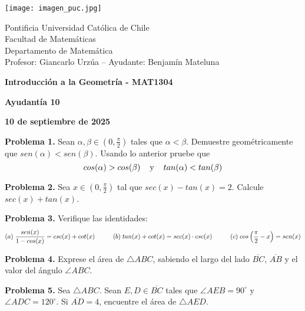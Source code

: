 \documentclass{article}
\begin{document}
\begin{minipage}{2.5cm}
    \texttt{[image: imagen\_puc.jpg]}
\end{minipage}
\begin{minipage}{14cm}
    {\sc Pontificia Universidad Católica de Chile\\
    Facultad de Matemáticas\\
    Departamento de Matemática\\
    Profesor: Giancarlo Urzúa -- Ayudante: Benjamín Mateluna}
\end{minipage}
\vspace{1ex}

{\centerline{\bf Introducción a la Geometría - MAT1304}
\centerline{\bf Ayudantía 10}}
\centerline{\bf 10 de septiembre de 2025}

\vspace{1cm}
\noindent\textbf{Problema 1.} Sean $\alpha,\beta\in(0,\frac{\pi}{2})$ tales que $\alpha<\beta$. 
Demuestre geométricamente que $sen(\alpha)<sen(\beta)$. Usando lo anterior pruebe que
\begin{equation*}
    cos(\alpha)>cos(\beta)\hspace{4mm}\text{y}\hspace{4mm}tan(\alpha)<tan(\beta)
\end{equation*}

\vspace{5mm}
\noindent\textbf{Problema 2.} Sea $x\in(0,\frac{\pi}{2})$ tal que $sec(x)-tan(x)=2$. Calcule
$sec(x)+tan(x)$.

\vspace{5mm}
\noindent\textbf{Problema 3.} Verifique las identidades:
\begin{equation*}
    (a)\hspace{1mm}\frac{sen(x)}{1-cos(x)}=csc(x)+cot(x)\hspace{1cm}
    (b)\hspace{1mm}tan(x)+cot(x)=sec(x)\cdot csc(x)\hspace{1cm}
    (c)\hspace{1mm}cos\left(\frac{\pi}{2}-x\right)=sen(x)
\end{equation*}

\vspace{5mm}
\noindent\textbf{Problema 4.} Exprese el área de $\triangle ABC$, sabiendo el largo del lado 
$\overline{BC}$, $\overline{AB}$ y el valor del ángulo $\angle ABC$.

\vspace{5mm}
\noindent\textbf{Problema 5.} Sea $\triangle ABC$. Sean $E,D\in\overline{BC}$ tales que 
$\angle AEB=90^{\circ}$ y $\angle ADC=120^{\circ}$. Si $\overline{AD}=4$, encuentre el área de 
$\triangle AED$.

\end{document}
